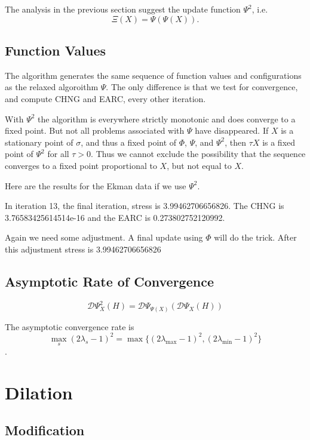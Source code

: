 \documentclass[
  12pt,
  letterpaper,
  DIV=11,
  numbers=noendperiod]{scrartcl}
\begin{document}
The analysis in the previous section suggest the update function
\(\Psi^2\), i.e. \[
\Xi(X)=\Psi(\Psi(X)).
\]

\subsection{Function Values}\label{function-values-5}

The algorithm generates the same sequence of function values and
configurations as the relaxed algoroithm \(\Psi\). The only difference
is that we test for convergence, and compute CHNG and EARC, every other
iteration.

With \(\Psi^2\) the algorithm is everywhere strictly monotonic and does
converge to a fixed point. But not all problems associated with \(\Psi\)
have disappeared. If \(X\) is a stationary point of \(\sigma\), and thus
a fixed point of \(\Phi\), \(\Psi\), and \(\Psi^2\), then \(\tau X\) is
a fixed point of \(\Psi^2\) for all \(\tau>0\). Thus we cannot exclude
the possibility that the sequence converges to a fixed point
proportional to \(X\), but not equal to \(X\).

Here are the results for the Ekman data if we use \(\Psi^2\).

In iteration 13, the final iteration, stress is 3.99462706656826. The
CHNG is 3.76583425614514e-16 and the EARC is 0.273802752120992.

Again we need some adjustment. A final update using \(\Phi\) will do the
trick. After this adjustment stress is 3.99462706656826

\subsection{Asymptotic Rate of
Convergence}\label{asymptotic-rate-of-convergence-5}

\[
\mathcal{D}\Psi^2_X(H)=\mathcal{D}\Psi_{\Psi(X)}(\mathcal{D}\Psi_X(H))
\]

The asymptotic convergence rate is \[
\max_s (2\lambda_s-1)^2=\max\{ (2\lambda_\text{max}-1)^2, (2\lambda_\text{min}-1)^2\}
\].

\section{Dilation}\label{dilation}

\subsection{Modification}\label{modification-5}
\end{document}
